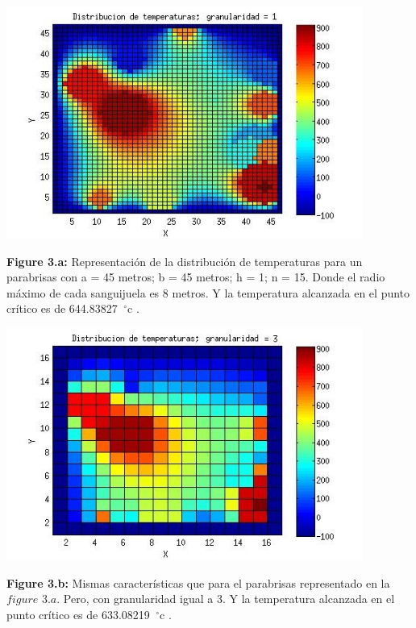 \includegraphics[width=\textwidth,height=3.0in,keepaspectratio
]{r7h1.jpg} \newline
\begin {flushleft}
\textbf{Figure 3.a:} Representación de la distribución de temperaturas para un parabrisas con a = 45 metros; b = 45 metros; h = 1; n = 15. Donde el radio máximo de cada sanguijuela es 8 metros. Y la temperatura alcanzada en el punto crítico es de 644.83827\hspace{-1.5mm}$\phantom{a}^{\circ}$c .
\end{flushleft}

\includegraphics[width=\textwidth,height=3.0in,keepaspectratio
]{r7h3.jpg} \newline
\begin {flushleft}
\textbf{Figure 3.b:} Mismas características que para el parabrisas representado en la $figure$ $3.a$. Pero, con granularidad igual a 3. Y la temperatura alcanzada en el punto crítico es de 633.08219\hspace{-1.5mm}$\phantom{a}^{\circ}$c .
\end{flushleft}

